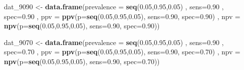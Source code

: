 \documentclass[12pt, twoside]{amherstthesis}
\newenvironment{Shaded}{\begin{snugshade}}{\end{snugshade}}
\newcommand{\AttributeTok}[1]{\textcolor[rgb]{0.13,0.29,0.53}{#1}}
\newcommand{\FloatTok}[1]{\textcolor[rgb]{0.00,0.00,0.81}{#1}}
\newcommand{\FunctionTok}[1]{\textcolor[rgb]{0.13,0.29,0.53}{\textbf{#1}}}
\newcommand{\NormalTok}[1]{#1}
\newcommand{\OtherTok}[1]{\textcolor[rgb]{0.56,0.35,0.01}{#1}}
\begin{document}
\begin{Shaded}
\begin{Highlighting}[]
\NormalTok{dat\_9090 }\OtherTok{\textless{}{-}} \FunctionTok{data.frame}\NormalTok{(}\AttributeTok{prevalence =} \FunctionTok{seq}\NormalTok{(}\FloatTok{0.05}\NormalTok{,}\FloatTok{0.95}\NormalTok{,}\FloatTok{0.05}\NormalTok{)}
\NormalTok{                       , }\AttributeTok{sens=}\FloatTok{0.90}
\NormalTok{                       , }\AttributeTok{spec=}\FloatTok{0.90}
\NormalTok{                       , }\AttributeTok{ppv =} \FunctionTok{ppv}\NormalTok{(}\AttributeTok{p=}\FunctionTok{seq}\NormalTok{(}\FloatTok{0.05}\NormalTok{,}\FloatTok{0.95}\NormalTok{,}\FloatTok{0.05}\NormalTok{), }
                                   \AttributeTok{sens=}\FloatTok{0.90}\NormalTok{, }
                                   \AttributeTok{spec=}\FloatTok{0.90}\NormalTok{)}
\NormalTok{                       , }\AttributeTok{npv =} \FunctionTok{npv}\NormalTok{(}\AttributeTok{p=}\FunctionTok{seq}\NormalTok{(}\FloatTok{0.05}\NormalTok{,}\FloatTok{0.95}\NormalTok{,}\FloatTok{0.05}\NormalTok{), }
                                   \AttributeTok{sens=}\FloatTok{0.90}\NormalTok{, }
                                   \AttributeTok{spec=}\FloatTok{0.90}\NormalTok{))}

\NormalTok{dat\_9070 }\OtherTok{\textless{}{-}} \FunctionTok{data.frame}\NormalTok{(}\AttributeTok{prevalence =} \FunctionTok{seq}\NormalTok{(}\FloatTok{0.05}\NormalTok{,}\FloatTok{0.95}\NormalTok{,}\FloatTok{0.05}\NormalTok{)}
\NormalTok{                       , }\AttributeTok{sens=}\FloatTok{0.90}
\NormalTok{                       , }\AttributeTok{spec=}\FloatTok{0.70}
\NormalTok{                       , }\AttributeTok{ppv =} \FunctionTok{ppv}\NormalTok{(}\AttributeTok{p=}\FunctionTok{seq}\NormalTok{(}\FloatTok{0.05}\NormalTok{,}\FloatTok{0.95}\NormalTok{,}\FloatTok{0.05}\NormalTok{), }
                                   \AttributeTok{sens=}\FloatTok{0.90}\NormalTok{, }
                                   \AttributeTok{spec=}\FloatTok{0.70}\NormalTok{)}
\NormalTok{                       , }\AttributeTok{npv =} \FunctionTok{npv}\NormalTok{(}\AttributeTok{p=}\FunctionTok{seq}\NormalTok{(}\FloatTok{0.05}\NormalTok{,}\FloatTok{0.95}\NormalTok{,}\FloatTok{0.05}\NormalTok{), }
                                   \AttributeTok{sens=}\FloatTok{0.90}\NormalTok{, }
                                   \AttributeTok{spec=}\FloatTok{0.70}\NormalTok{))}


\end{Highlighting}
\end{Shaded}
\end{document}
